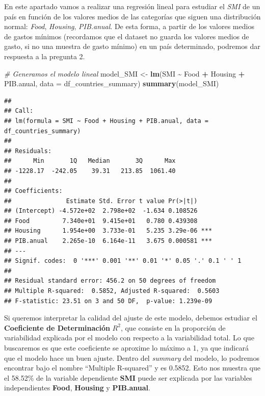 \documentclass[
]{article}
\newenvironment{Shaded}{\begin{snugshade}}{\end{snugshade}}
\newcommand{\AttributeTok}[1]{\textcolor[rgb]{0.13,0.29,0.53}{#1}}
\newcommand{\CommentTok}[1]{\textcolor[rgb]{0.56,0.35,0.01}{\textit{#1}}}
\newcommand{\FunctionTok}[1]{\textcolor[rgb]{0.13,0.29,0.53}{\textbf{#1}}}
\newcommand{\NormalTok}[1]{#1}
\newcommand{\OtherTok}[1]{\textcolor[rgb]{0.56,0.35,0.01}{#1}}
\newcommand{\SpecialCharTok}[1]{\textcolor[rgb]{0.81,0.36,0.00}{\textbf{#1}}}
\begin{document}
\hfill\break

En este apartado vamos a realizar una regresión lineal para estudiar el
\emph{SMI} de un país en función de los valores medios de las categorías
que siguen una distribución normal: \emph{Food}, \emph{Housing},
\emph{PIB.anual}. De esta forma, a partir de los valores medios de
gastos mínimos (recordamos que el dataset no guarda los valores medios
de gasto, si no una muestra de gasto mínimo) en un país determinado,
podremos dar respuesta a la pregunta 2.

\begin{Shaded}
\begin{Highlighting}[]
\CommentTok{\# Generamos el modelo lineal}
\NormalTok{model\_SMI }\OtherTok{\textless{}{-}} \FunctionTok{lm}\NormalTok{(SMI }\SpecialCharTok{\textasciitilde{}}\NormalTok{ Food }\SpecialCharTok{+}\NormalTok{ Housing }\SpecialCharTok{+}\NormalTok{ PIB.anual, }\AttributeTok{data =}\NormalTok{ df\_countries\_summary)}
\FunctionTok{summary}\NormalTok{(model\_SMI)}
\end{Highlighting}
\end{Shaded}

\begin{verbatim}
## 
## Call:
## lm(formula = SMI ~ Food + Housing + PIB.anual, data = df_countries_summary)
## 
## Residuals:
##      Min       1Q   Median       3Q      Max 
## -1228.17  -242.05    39.31   213.85  1061.40 
## 
## Coefficients:
##               Estimate Std. Error t value Pr(>|t|)    
## (Intercept) -4.572e+02  2.798e+02  -1.634 0.108526    
## Food         7.340e+01  9.415e+01   0.780 0.439308    
## Housing      1.954e+00  3.733e-01   5.235 3.29e-06 ***
## PIB.anual    2.265e-10  6.164e-11   3.675 0.000581 ***
## ---
## Signif. codes:  0 '***' 0.001 '**' 0.01 '*' 0.05 '.' 0.1 ' ' 1
## 
## Residual standard error: 456.2 on 50 degrees of freedom
## Multiple R-squared:  0.5852, Adjusted R-squared:  0.5603 
## F-statistic: 23.51 on 3 and 50 DF,  p-value: 1.239e-09
\end{verbatim}

Si queremos interpretar la calidad del ajuste de este modelo, debemos
estudiar el \textbf{Coeficiente de Determinación} \(R^2\), que consiste
en la proporción de variabilidad explicada por el modelo con respecto a
la variabilidad total. Lo que buscaremos es que este coeficiente se
aproxime lo máximo a 1, ya que indicará que el modelo hace un buen
ajuste. Dentro del \emph{summary} del modelo, lo podremos encontrar bajo
el nombre ``Multiple R-squared'' y es 0.5852. Esto nos muestra que el
58.52\% de la variable dependiente \textbf{SMI} puede ser explicada por
las variables independientes \textbf{Food}, \textbf{Housing} y
\textbf{PIB.anual}.
\end{document}
